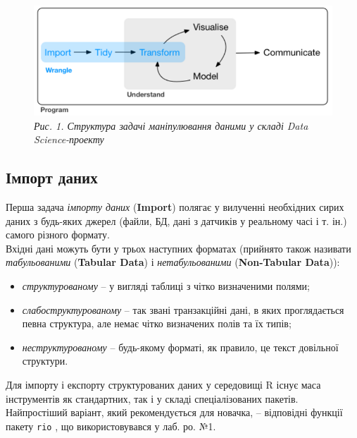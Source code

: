 \documentclass[
]{book}
\providecommand{\tightlist}{%
  \setlength{\itemsep}{0pt}\setlength{\parskip}{0pt}}
\begin{document}
\begin{figure}
\centering
\includegraphics{image/wrangling.png}
\caption{\emph{Рис. 1. Структура задачі маніпулювання даними у складі Data Science-проекту}}
\end{figure}

\hypertarget{ux456ux43cux43fux43eux440ux442-ux434ux430ux43dux438ux445}{%
\subsection{Імпорт даних}\label{ux456ux43cux43fux43eux440ux442-ux434ux430ux43dux438ux445}}

Перша задача \emph{імпорту даних} (\textbf{Import}) полягає у вилученні необхідних сирих даних з будь-яких джерел (файли, БД, дані з датчиків у реальному часі і т. ін.) самого різного формату.\\
Вхідні дані можуть бути у трьох наступних форматах (прийнято також називати \emph{табульованими} (\textbf{Tabular Data}) і \emph{нетабульованими} (\textbf{Non-Tabular Data})):

\begin{itemize}
\tightlist
\item
  \emph{структурованому} -- у вигляді таблиці з чітко визначеними полями;
\item
  \emph{слабоструктурованому} -- так звані транзакційні дані, в яких проглядається певна структура, але немає чітко визначених полів та їх типів;\\
\item
  \emph{неструктурованому} -- будь-якому форматі, як правило, це текст довільної структури.
\end{itemize}

Для імпорту і експорту структурованих даних у середовищі R існує маса інструментів як стандартних, так і у складі спеціалізованих пакетів. Найпростіший варіант, який рекомендується для новачка, -- відповідні функції пакету \texttt{rio} \citep{rio}, що використовувався у лаб. ро. №1.
\end{document}
